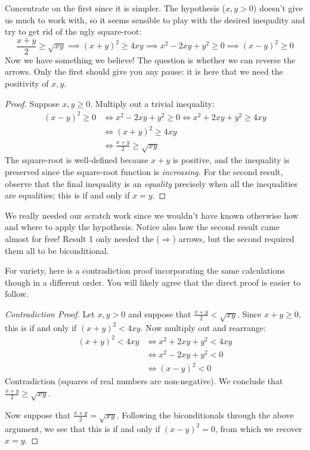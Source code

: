 Concentrate on the first since it is simpler. The hypothesis ($x,y>0$) doesn't give us much to work with, so it seems sensible to play with the desired inequality and try to get rid of the ugly square-root:
\[
	\frac{x+y}2\ge \sqrt{xy} \implies (x+y)^2\ge 4xy \implies x^2-2xy+y^2\ge 0\implies (x-y)^2\ge 0
\]
Now we have something we believe! The question is whether we can reverse the arrows. Only the first should give you any pause: it is here that we need the positivity of $x,y$.

\begin{proof}
	Suppose $x,y\ge 0$. Multiply out a trivial inequality:
	\begin{align*}
		(x-y)^2\ge 0&\iff x^2-2xy+y^2\ge 0 \iff x^2+2xy+y^2\ge 4xy\\
		&\iff (x+y)^2\ge 4xy\\
		&\iff \frac{x+y}{2}\ge \sqrt{xy}
	\end{align*}
	The square-root is well-defined because $x+y$ is positive, and the inequality is preserved since the square-root function is \emph{increasing.} For the second result, observe that the final inequality is an \emph{equality} precisely when all the inequalities are equalities; this is if and only if $x=y$.
\end{proof}

We really needed our scratch work since we wouldn't have known otherwise how and where to apply the hypothesis. Notice also how the second result came almost for free! Result 1 only needed the ($\Rightarrow$) arrows, but the second required them all to be biconditional.

\goodbreak 

For variety, here is a contradiction proof incorporating the same calculations though in a different order. You will likely agree that the direct proof is easier to follow.

\begin{proof}[Contradiction Proof]
	Let $x,y>0$ and suppose that $\frac{x+y}{2}<\sqrt{xy}$. Since $x+y\ge 0$, this is if and only if $(x+y)^2<4xy$. Now multiply out and rearrange:
	\begin{align*}
		(x+y)^2<4xy&\iff x^2+2xy+y^2<4xy\\
		&\iff x^2-2xy+y^2<0\\
		&\iff (x-y)^2<0
	\end{align*}
	Contradiction (squares of real numbers are non-negative). We conclude that $\frac{x+y}{2}\ge \sqrt{xy}$.\par
	Now suppose that $\frac{x+y}{2}=\sqrt{xy}$. Following the biconditionals through the above argument, we see that this is if and only if $(x-y)^2=0$, from which we recover $x=y$.
\end{proof}


